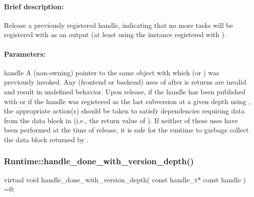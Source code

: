 \paragraph{Brief description:} Release a previously registered handle, indicating that no more tasks will be registered
       with  as an output (at least using the instance registered with ).
     
\paragraph{Parameters:} 
\begin{compactdesc}
\item[handle] A (non-owning) pointer to the same object with which  (or
       ) was previously invoked.  Any (frontend or backend) uses of 
       after  is returns are invalid and result in undefined behavior.  Upon release,
       if the handle has been published with  or if the handle was registered
       as the last subversion at a given depth using , the
       appropriate action(s) should be taken to satisfy dependencies requiring data from the data block
       in  (i.e., the return value of ).  If neither of these uses have
       been performed at the time of release, it is safe for the runtime to garbage collect the data block
       returned by .
\end{compactdesc}


\subsubsection{Runtime::handle\_done\_with\_version\_depth()}
\begin{CppCode}
    virtual void
    handle_done_with_version_depth(
      const handle_t* const handle
    ) =0;
\end{CppCode}

